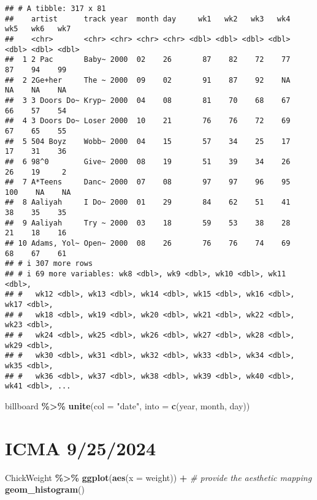 \documentclass[
]{article}
\newenvironment{Shaded}{\begin{snugshade}}{\end{snugshade}}
\newcommand{\AttributeTok}[1]{\textcolor[rgb]{0.13,0.29,0.53}{#1}}
\newcommand{\CommentTok}[1]{\textcolor[rgb]{0.56,0.35,0.01}{\textit{#1}}}
\newcommand{\FunctionTok}[1]{\textcolor[rgb]{0.13,0.29,0.53}{\textbf{#1}}}
\newcommand{\NormalTok}[1]{#1}
\newcommand{\SpecialCharTok}[1]{\textcolor[rgb]{0.81,0.36,0.00}{\textbf{#1}}}
\newcommand{\StringTok}[1]{\textcolor[rgb]{0.31,0.60,0.02}{#1}}
\begin{document}
\begin{verbatim}
## # A tibble: 317 x 81
##    artist      track year  month day     wk1   wk2   wk3   wk4   wk5   wk6   wk7
##    <chr>       <chr> <chr> <chr> <chr> <dbl> <dbl> <dbl> <dbl> <dbl> <dbl> <dbl>
##  1 2 Pac       Baby~ 2000  02    26       87    82    72    77    87    94    99
##  2 2Ge+her     The ~ 2000  09    02       91    87    92    NA    NA    NA    NA
##  3 3 Doors Do~ Kryp~ 2000  04    08       81    70    68    67    66    57    54
##  4 3 Doors Do~ Loser 2000  10    21       76    76    72    69    67    65    55
##  5 504 Boyz    Wobb~ 2000  04    15       57    34    25    17    17    31    36
##  6 98^0        Give~ 2000  08    19       51    39    34    26    26    19     2
##  7 A*Teens     Danc~ 2000  07    08       97    97    96    95   100    NA    NA
##  8 Aaliyah     I Do~ 2000  01    29       84    62    51    41    38    35    35
##  9 Aaliyah     Try ~ 2000  03    18       59    53    38    28    21    18    16
## 10 Adams, Yol~ Open~ 2000  08    26       76    76    74    69    68    67    61
## # i 307 more rows
## # i 69 more variables: wk8 <dbl>, wk9 <dbl>, wk10 <dbl>, wk11 <dbl>,
## #   wk12 <dbl>, wk13 <dbl>, wk14 <dbl>, wk15 <dbl>, wk16 <dbl>, wk17 <dbl>,
## #   wk18 <dbl>, wk19 <dbl>, wk20 <dbl>, wk21 <dbl>, wk22 <dbl>, wk23 <dbl>,
## #   wk24 <dbl>, wk25 <dbl>, wk26 <dbl>, wk27 <dbl>, wk28 <dbl>, wk29 <dbl>,
## #   wk30 <dbl>, wk31 <dbl>, wk32 <dbl>, wk33 <dbl>, wk34 <dbl>, wk35 <dbl>,
## #   wk36 <dbl>, wk37 <dbl>, wk38 <dbl>, wk39 <dbl>, wk40 <dbl>, wk41 <dbl>, ...
\end{verbatim}

\begin{Shaded}
\begin{Highlighting}[]
\NormalTok{billboard }\SpecialCharTok{\%\textgreater{}\%}
  \FunctionTok{unite}\NormalTok{(}\AttributeTok{col =} \StringTok{"date"}\NormalTok{,}
        \AttributeTok{into =} \FunctionTok{c}\NormalTok{(year, month, day))}
\end{Highlighting}
\end{Shaded}

\section{ICMA 9/25/2024}\label{icma-9252024}

\begin{Shaded}
\begin{Highlighting}[]
\NormalTok{ChickWeight }\SpecialCharTok{\%\textgreater{}\%}
  \FunctionTok{ggplot}\NormalTok{(}\FunctionTok{aes}\NormalTok{(}\AttributeTok{x =}\NormalTok{ weight)) }\SpecialCharTok{+} \CommentTok{\# provide the aesthetic mapping }
   \FunctionTok{geom\_histogram}\NormalTok{()}
\end{Highlighting}
\end{Shaded}
\end{document}
